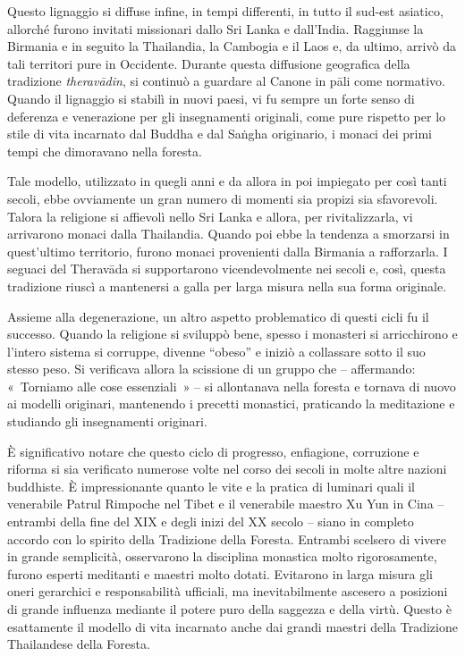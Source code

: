 Questo lignaggio si diffuse infine, in tempi differenti, in tutto il
sud-est asiatico, allorché furono invitati missionari dallo Sri Lanka e
dall'India. Raggiunse la Birmania e in seguito la Thailandia, la
Cambogia e il Laos e, da ultimo, arrivò da tali territori pure in
Occidente. Durante questa diffusione geografica della tradizione
\emph{theravādin}, si continuò a guardare al Canone in pāli come
normativo. Quando il lignaggio si stabilì in nuovi paesi, vi fu sempre
un forte senso di deferenza e venerazione per gli insegnamenti
originali, come pure rispetto per lo stile di vita incarnato dal Buddha
e dal Saṅgha originario, i monaci dei primi tempi che dimoravano nella
foresta.

Tale modello, utilizzato in quegli anni e da allora in poi impiegato per
così tanti secoli, ebbe ovviamente un gran numero di momenti sia propizi
sia sfavorevoli. Talora la religione si affievolì nello Sri Lanka e
allora, per rivitalizzarla, vi arrivarono monaci dalla Thailandia.
Quando poi ebbe la tendenza a smorzarsi in quest'ultimo territorio,
furono monaci provenienti dalla Birmania a rafforzarla. I seguaci del
Theravāda si supportarono vicendevolmente nei secoli e, così, questa
tradizione riuscì a mantenersi a galla per larga misura nella sua forma
originale.

Assieme alla degenerazione, un altro aspetto problematico di questi
cicli fu il successo. Quando la religione si sviluppò bene, spesso i
monasteri si arricchirono e l'intero sistema si corruppe, divenne
``obeso'' e iniziò a collassare sotto il suo stesso peso. Si verificava
allora la scissione di un gruppo che -- affermando: «~Torniamo alle cose
essenziali~» -- si allontanava nella foresta e tornava di nuovo ai
modelli originari, mantenendo i precetti monastici, praticando la
meditazione e studiando gli insegnamenti originari.

È significativo notare che questo ciclo di progresso, enfiagione,
corruzione e riforma si sia verificato numerose volte nel corso dei
secoli in molte altre nazioni buddhiste. È impressionante quanto le vite
e la pratica di luminari quali il venerabile Patrul Rimpoche nel Tibet e
il venerabile maestro Xu Yun in Cina -- entrambi della fine del XIX e
degli inizi del XX secolo -- siano in completo accordo con lo spirito
della Tradizione della Foresta. Entrambi scelsero di vivere in grande
semplicità, osservarono la disciplina monastica molto rigorosamente,
furono esperti meditanti e maestri molto dotati. Evitarono in larga
misura gli oneri gerarchici e responsabilità ufficiali, ma
inevitabilmente ascesero a posizioni di grande influenza mediante il
potere puro della saggezza e della virtù. Questo è esattamente il
modello di vita incarnato anche dai grandi maestri della Tradizione
Thailandese della Foresta.

